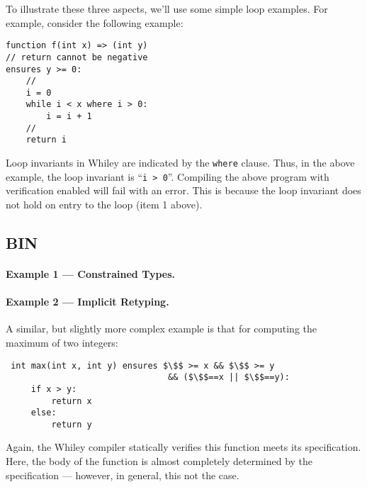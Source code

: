 To illustrate these three aspects, we'll use some simple loop
examples.  For example, consider the following example:

\begin{lstlisting}
function f(int x) => (int y)
// return cannot be negative
ensures y >= 0:
    //
    i = 0
    while i < x where i > 0:
        i = i + 1 
    //
    return i
\end{lstlisting}

Loop invariants in Whiley are indicated by the \lstinline{where}
clause.  Thus, in the above example, the loop invariant is
``\lstinline{i > 0}''.  Compiling the above program with verification
enabled will fail with an error.   This is because the loop invariant
does not hold on entry to the loop (item 1 above).

\subsection{BIN}
\paragraph{Example 1 --- Constrained Types.}


\paragraph{Example 2 --- Implicit Retyping.}

A similar, but slightly more complex example is that for computing the
maximum of two integers:
\begin{lstlisting}
 int max(int x, int y) ensures $\$$ >= x && $\$$ >= y 
                                && ($\$$==x || $\$$==y):
     if x > y:
         return x
     else:
         return y
\end{lstlisting}
Again, the Whiley compiler statically verifies this function meets its
specification.  Here, the body of the function is almost completely
determined by the specification --- however, in general, this not the
case.

